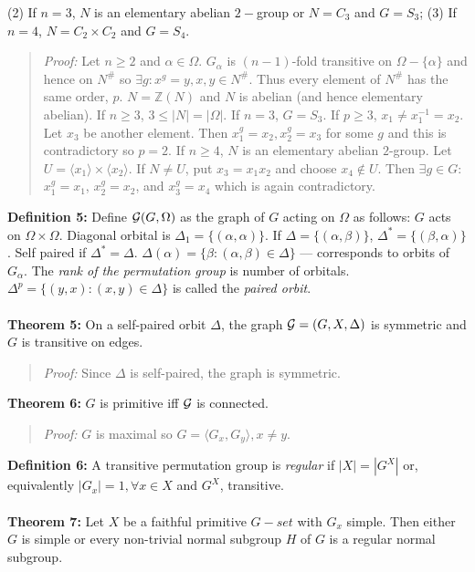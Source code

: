 (2) If $n=3$, $N$ is an elementary abelian $2-$group or $N=C_3$ and $G=S_3$;
(3) If $n=4$, $N= C_2 \times C_2$ and $G=S_4$.
\begin{quote}
\emph{Proof:}  
Let $n \geq 2$ and $\alpha \in \Omega$.  $G_{\alpha}$ is $(n-1)$-fold transitive on $\Omega - \{ \alpha \}$ and
hence on $N^{\#}$ so $\exists g: x^g=y, x,y \in N^{\#}$.  Thus every element of $N^{\#}$ has the same order, $p$.
$N= {\mathbb Z}(N)$ and $N$ is abelian (and hence elementary abelian).
If $n \geq 3$, $3 \leq |N|=|\Omega|$.  If $n=3$, $G=S_3$.  If $p \geq 3$, $x_1 \neq x_1^{-1}=x_2$.  Let $x_3$ be another 
element.  Then $x_1^g= x_2, x_2^g=x_3$ for some $g$ and this is contradictory so $p=2$.
If $n \geq 4$, $N$ is an elementary abelian $2$-group.  Let $U= \langle x_1 \rangle \times \langle x_2 \rangle$.
If $N \neq U$, put $x_3=x_1 x_2$ and choose $x_4 \notin U$.  Then $\exists g \in G:$
$x_1^g= x_1$,
$x_2^g= x_2$, and
$x_3^g= x_4$ which is again contradictory.
\end{quote}
{\bf Definition 5:}
Define ${\cal G}(G, \Omega )$ as the graph of $G$ acting on $\Omega$ as follows:
$G$ acts on $\Omega \times \Omega$.  Diagonal orbital is
$\Delta_1 = \{ (\alpha , \alpha )\}$. If $\Delta = \{ (\alpha , \beta ) \}$,
$\Delta^*= \{ (\beta, \alpha) \}$.  Self paired if $\Delta^* = \Delta$.
$\Delta(\alpha)= \{ \beta : (\alpha , \beta ) \in \Delta \}$ --- corresponds to 
orbits of $G_{\alpha}$. The \emph{rank of the permutation group} is number of orbitals.
$\Delta^p= \{ (y,x): (x, y) \in \Delta \}$ is called the \emph{paired orbit}.
\\
\\
{\bf Theorem 5:}
On a self-paired orbit $\Delta$, the graph ${\cal G}=(G, X,\Delta)$ is 
symmetric and $G$ is transitive on edges.
\begin{quote}
\emph{Proof:}  
Since $\Delta$ is self-paired, the graph is symmetric.  
\end{quote}
{\bf Theorem 6:}
$G$ is primitive iff ${\cal G}$ is connected.
\begin{quote}
\emph{Proof:}  
$G$ is maximal so $G= \langle G_x , G_y \rangle , x \ne y$.
\end{quote}
{\bf Definition 6:}
A transitive permutation group is \emph{regular} if $|X|= |G^X|$ or, equivalently 
$|G_x|=1, \forall x \in X$ and $G^X$, transitive.
\\
\\
{\bf Theorem 7:}
Let $X$ be a faithful primitive $G-set$ with $G_x$ simple.  Then either $G$ is simple or
every non-trivial normal subgroup $H$ of $G$ is a regular normal subgroup.
